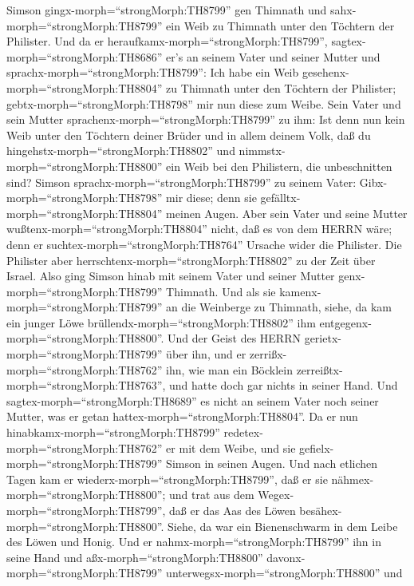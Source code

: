  Simson gingx-morph=``strongMorph:TH8799'' gen Thimnath und
sahx-morph=``strongMorph:TH8799'' ein Weib zu Thimnath unter den
Töchtern der Philister.  Und da er
heraufkamx-morph=``strongMorph:TH8799'',
sagtex-morph=``strongMorph:TH8686'' er's an seinem Vater und seiner
Mutter und sprachx-morph=``strongMorph:TH8799'': Ich habe ein Weib
gesehenx-morph=``strongMorph:TH8804'' zu Thimnath unter den Töchtern der
Philister; gebtx-morph=``strongMorph:TH8798'' mir nun diese zum Weibe.
 Sein Vater und sein Mutter
sprachenx-morph=``strongMorph:TH8799'' zu ihm: Ist denn nun kein Weib
unter den Töchtern deiner Brüder und in allem deinem Volk, daß du
hingehstx-morph=``strongMorph:TH8802'' und
nimmstx-morph=``strongMorph:TH8800'' ein Weib bei den Philistern, die
unbeschnitten sind? Simson sprachx-morph=``strongMorph:TH8799'' zu
seinem Vater: Gibx-morph=``strongMorph:TH8798'' mir diese; denn sie
gefälltx-morph=``strongMorph:TH8804'' meinen Augen.  Aber
sein Vater und seine Mutter wußtenx-morph=``strongMorph:TH8804'' nicht,
daß es von dem HERRN wäre; denn er suchtex-morph=``strongMorph:TH8764''
Ursache wider die Philister. Die Philister aber
herrschtenx-morph=``strongMorph:TH8802'' zu der Zeit über Israel.
 Also ging Simson hinab mit seinem Vater und seiner Mutter
genx-morph=``strongMorph:TH8799'' Thimnath. Und als sie
kamenx-morph=``strongMorph:TH8799'' an die Weinberge zu Thimnath, siehe,
da kam ein junger Löwe brüllendx-morph=``strongMorph:TH8802'' ihm
entgegenx-morph=``strongMorph:TH8800''.  Und der Geist des
HERRN gerietx-morph=``strongMorph:TH8799'' über ihn, und er
zerrißx-morph=``strongMorph:TH8762'' ihn, wie man ein Böcklein
zerreißtx-morph=``strongMorph:TH8763'', und hatte doch gar nichts in
seiner Hand. Und sagtex-morph=``strongMorph:TH8689'' es nicht an seinem
Vater noch seiner Mutter, was er getan
hattex-morph=``strongMorph:TH8804''.  Da er nun
hinabkamx-morph=``strongMorph:TH8799''
redetex-morph=``strongMorph:TH8762'' er mit dem Weibe, und sie
gefielx-morph=``strongMorph:TH8799'' Simson in seinen Augen.
 Und nach etlichen Tagen kam er
wiederx-morph=``strongMorph:TH8799'', daß er sie
nähmex-morph=``strongMorph:TH8800''; und trat aus dem
Wegex-morph=``strongMorph:TH8799'', daß er das Aas des Löwen
besähex-morph=``strongMorph:TH8800''. Siehe, da war ein Bienenschwarm in
dem Leibe des Löwen und Honig.  Und er
nahmx-morph=``strongMorph:TH8799'' ihn in seine Hand und
aßx-morph=``strongMorph:TH8800'' davonx-morph=``strongMorph:TH8799''
unterwegsx-morph=``strongMorph:TH8800'' und

